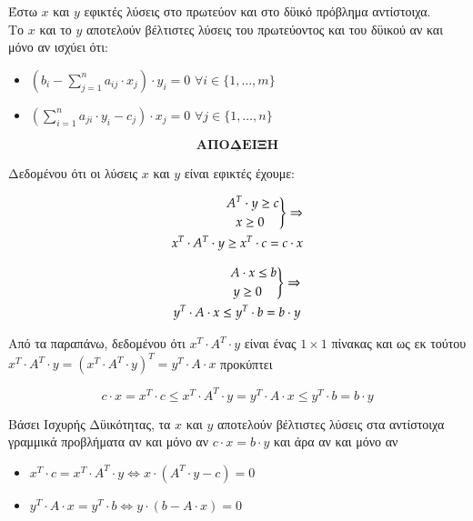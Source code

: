 \documentclass[12pt]{article}
\newcommand{\margin}{\hspace{4pt}}
\newenvironment{rcases}
	{\left.\begin{aligned}}
	{\end{aligned}\right\rbrace}
\begin{document}
Έστω \( x \) και \( y \) εφικτές λύσεις στο πρωτεύον και στο δϋικό πρόβλημα αντίστοιχα. \\

Το \( x \) και το \( y \) αποτελούν βέλτιστες λύσεις του πρωτεύοντος και του δϋικού
αν και μόνο αν ισχύει ότι: \\

\begin{itemize}
    \item \( (b_i - \sum_{j=1}^{n} {a_{ij}} \cdot x_j) \cdot y_i = 0 \margin \forall i \in \{ 1, \ldots, m\} \)
    \item \( (\sum_{i = 1}^{n} a_{ji} \cdot y_i - c_j) \cdot x_j = 0 \margin \forall j \in \{ 1, \ldots, n\} \)
\end{itemize}

\[ \underline{\textbf{ΑΠΟΔΕΙΞΗ}} \]

Δεδομένου ότι οι λύσεις \( x \) και \( y \) είναι εφικτές έχουμε:

\begin{align*}
    \begin{rcases}
        A^T & \cdot y \geq c \\
        x & \geq 0
    \end{rcases}
    \Rightarrow \\
    x^T \cdot A^T \cdot y \geq x^T \cdot c = c \cdot x
\end{align*}

\begin{align*}
    \begin{rcases}
        A & \cdot x \leq b \\
        y & \geq 0
    \end{rcases}
    \Rightarrow \\
    y^T \cdot A \cdot x \leq y^T \cdot b = b \cdot y
\end{align*}

Από τα παραπάνω, δεδομένου ότι \( x^T \cdot A^T \cdot y \) είναι ένας \( 1 \times 1 \)
πίνακας και ως εκ τούτου \( x^T \cdot A^T \cdot y = (x^T \cdot A^T \cdot y)^T = y^T \cdot A \cdot x\)
προκύπτει

\[ c \cdot x = x^T \cdot c \leq x^T \cdot A^T \cdot y = y^T \cdot A \cdot x \leq y^T \cdot b = b \cdot y \]

Βάσει Ισχυρής Δϋικότητας, τα \( x \) και \( y \) αποτελούν βέλτιστες λύσεις στα αντίστοιχα
γραμμικά προβλήματα αν και μόνο αν \( c \cdot x = b \cdot y \) και άρα αν και μόνο αν

\begin{itemize}
    \item \( x^T \cdot c = x^T \cdot A^T \cdot y \Leftrightarrow x \cdot (A^T \cdot y - c) = 0 \)
    \item \( y^T \cdot A \cdot x = y^T \cdot b \Leftrightarrow y \cdot (b - A \cdot x) = 0 \)
\end{itemize}
\end{document}
